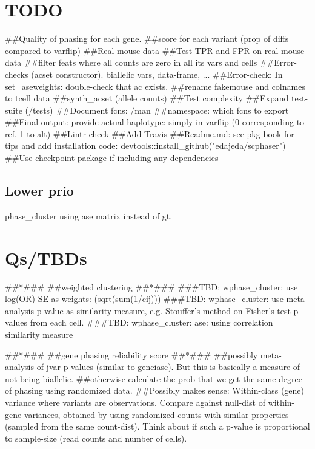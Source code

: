 

\section{TODO}
##Quality of phasing for each gene. 
##score for each variant (prop of diffs compared to varflip)
##Real mouse data
##Test TPR and FPR on real mouse data
##filter feats where all counts are zero in all its vars and cells
##Error-checks (acset constructor). biallelic vars, data-frame, ...
##Error-check: In set_aseweights: double-check that ac exists.
##rename fakemouse and colnames to tcell data
##synth_acset (allele counts)
##Test complexity
##Expand test-suite (/tests)
##Document fcns: /man
##namespace: which fcns to export
##Final output: provide actual haplotype: simply in varflip (0 corresponding to ref, 1 to alt)
##Lintr check
##Add Travis
##Readme.md: see pkg book for tips and add installation code: devtools::install_github("edajeda/scphaser")
##Use checkpoint package if including any dependencies

\subsection{Lower prio}
phase_cluster using ase matrix instead of gt.

\section{Qs/TBDs}

##*###
##weighted clustering
##*###
###TBD: wphase_cluster: use log(OR) SE as weights: (sqrt(sum(1/cij)))
###TBD: wphase_cluster: use meta-analysis p-value as similarity measure, e.g. Stouffer's method on Fisher's test p-values from each cell.
###TBD: wphase_cluster: ase: using correlation similarity measure

##*###
##gene phasing reliability score
##*###
##possibly meta-analysis of jvar p-values (similar to geneiase). But
this is basically a measure of not being biallelic.
##otherwise calculate the prob that we get the same degree of phasing using randomized data.
##Possibly makes sense: Within-class (gene) variance where variants are observations. Compare
against null-dist of within-gene variances, obtained by using randomized counts with similar properties
(sampled from the same count-dist). Think about if such a p-value is
proportional to sample-size (read counts and number of cells).

